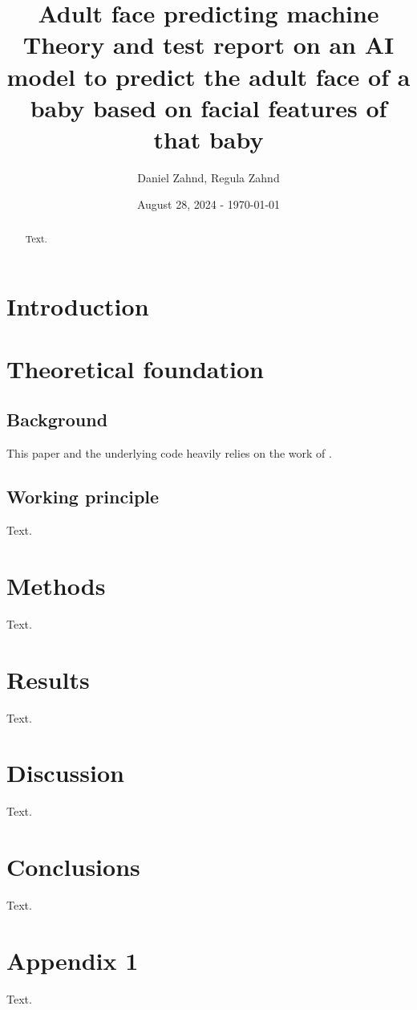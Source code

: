 \documentclass[a4paper,10pt, twocolumn]{article}
\author{Daniel Zahnd, Regula Zahnd}
\date{August 28, 2024 - \today}
\title{Adult face predicting machine \\ \vspace{0.5cm} \normalsize Theory and test report on an AI model to predict the adult face of a baby based on facial features of that baby}
\begin{document}
\maketitle


\begin{abstract}
Text.
\end{abstract}

\section{Introduction}
\lipsum

\section{Theoretical foundation}
\subsection{Background}
This paper and the underlying code heavily relies on the work of \cite{DBLP:journals/corr/IsolaZZE16}.

\subsection{Working principle}
Text.

\section{Methods}
Text.

\section{Results}

Text.

\section{Discussion}
Text.

\section{Conclusions}
Text.

\appendix
\section{Appendix 1}
Text.



\end{document}
